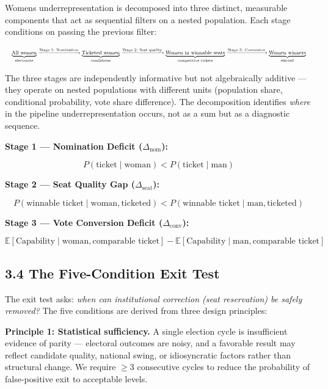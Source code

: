 \documentclass[
]{article}
\begin{document}
Women\textquotesingle s underrepresentation is decomposed into three distinct, measurable components that act as sequential filters on a nested population. Each stage conditions on passing the previous filter:

\[\resizebox{\textwidth}{!}{$\underbrace{\text{All women}}_{\text{electorate}} \xrightarrow{\text{Stage 1: Nomination}} \underbrace{\text{Ticketed women}}_{\text{candidates}} \xrightarrow{\text{Stage 2: Seat quality}} \underbrace{\text{Women in winnable seats}}_{\text{competitive tickets}} \xrightarrow{\text{Stage 3: Conversion}} \underbrace{\text{Women winners}}_{\text{elected}}$}\]

The three stages are independently informative but not algebraically additive --- they operate on nested populations with different units (population share, conditional probability, vote share difference). The decomposition identifies \emph{where} in the pipeline underrepresentation occurs, not as a sum but as a diagnostic sequence.

\textbf{Stage 1 --- Nomination Deficit (\(\Delta_{\text{nom}}\)):}

\[P(\text{ticket} \mid \text{woman}) < P(\text{ticket} \mid \text{man})\]

\textbf{Stage 2 --- Seat Quality Gap (\(\Delta_{\text{seat}}\)):}

\[P(\text{winnable ticket} \mid \text{woman}, \text{ticketed}) < P(\text{winnable ticket} \mid \text{man}, \text{ticketed})\]

\textbf{Stage 3 --- Vote Conversion Deficit (\(\Delta_{\text{conv}}\)):}

\[\mathbb{E}[\text{Capability} \mid \text{woman}, \text{comparable ticket}] - \mathbb{E}[\text{Capability} \mid \text{man}, \text{comparable ticket}]\]

\subsection{3.4 The Five-Condition Exit Test}\label{34-the-five-condition-exit-test}

The exit test asks: \emph{when can institutional correction (seat reservation) be safely removed?} The five conditions are derived from three design principles:

\textbf{Principle 1: Statistical sufficiency.} A single election cycle is insufficient evidence of parity --- electoral outcomes are noisy, and a favorable result may reflect candidate quality, national swing, or idiosyncratic factors rather than structural change. We require $\geq$3 consecutive cycles to reduce the probability of false-positive exit to acceptable levels.
\end{document}
